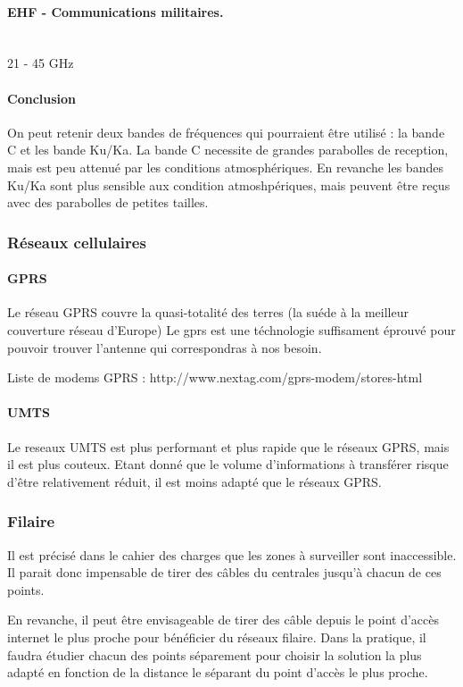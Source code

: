         \paragraph{EHF - Communications militaires.}~\\
        21 - 45 GHz 
        
        \paragraph{Conclusion}
            On peut retenir deux bandes de fréquences qui pourraient être utilisé : la bande C et les bande Ku/Ka.
            La bande C necessite de grandes parabolles de reception, mais est peu attenué par les conditions atmosphériques.
            En revanche les bandes Ku/Ka sont plus sensible aux condition atmoshpériques, mais peuvent être reçus avec des parabolles de petites tailles.

    \subsubsection{Réseaux cellulaires}

            \paragraph{GPRS}
                Le réseau GPRS couvre la quasi-totalité des terres (la suéde à la meilleur couverture réseau d'Europe)
                Le gprs est une téchnologie suffisament éprouvé pour pouvoir trouver l'antenne qui correspondras à nos besoin.


                Liste de modems GPRS :
                http://www.nextag.com/gprs-modem/stores-html

             \paragraph{UMTS}
                Le reseaux UMTS est plus performant et plus rapide que le réseaux GPRS, mais il est plus couteux.
                Etant donné que le volume d'informations à transférer risque d'être relativement réduit, il est moins adapté que le réseaux GPRS.
                
                
\subsubsection{Filaire}
        Il est précisé dans le cahier des charges que les zones à surveiller sont inaccessible.
        Il parait donc impensable de tirer des câbles du centrales jusqu'à chacun de ces points.

        En revanche, il peut être envisageable de tirer des câble depuis le point d'accès internet le plus proche pour bénéficier du réseaux filaire.
        Dans la pratique, il faudra étudier chacun des points séparement pour choisir la solution la plus adapté en fonction de la distance le séparant du point d'accès le plus proche.
